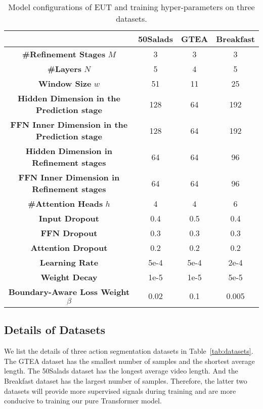 \documentclass[letterpaper]{article} \usepackage[submission]{aaai23}  \usepackage{times}  \usepackage{helvet}  \usepackage{courier}  \usepackage[hyphens]{url}  \usepackage{graphicx} \urlstyle{rm} \def\UrlFont{\rm}  \usepackage{natbib}  \usepackage{caption} \frenchspacing  \setlength{\pdfpagewidth}{8.5in} \setlength{\pdfpageheight}{11in} \usepackage{algorithm}
\begin{document}
\begin{table*}[t]
\centering
\begin{tabular}{cccc}
    \toprule
    & 50Salads & GTEA  & Breakfast \\
    \midrule
    \textbf{\#Refinement Stages} $M$                & 3 & 3 & 3 \\
    \textbf{\#Layers} $N$                & 5 &  4 & 5 \\
    \textbf{Window Size} $w$                & 51 & 11 & 25 \\
    \textbf{Hidden Dimension in the Prediction stage}   & 128 & 64 &  192\\
    \textbf{FFN Inner Dimension in the Prediction stage}     & 128 & 64 &  192\\
    \textbf{Hidden Dimension in Refinement stages}   & 64 &  64 & 96\\
    \textbf{FFN Inner Dimension in Refinement stages} & 64 &  64 & 96\\
    \textbf{\#Attention Heads} $h$           & 4 &  4 & 6\\
    \textbf{Input Dropout}  & 0.4 & 0.5  & 0.4\\
    \textbf{FFN Dropout}    & 0.3 & 0.3 &  0.3\\
    \textbf{Attention Dropout}    & 0.2 &  0.2 &  0.2\\
    \textbf{Learning Rate}   & 5e-4 & 5e-4 &  2e-4\\
    \textbf{Weight Decay}   & 1e-5 & 1e-5 &  5e-5\\
    \textbf{Boundary-Aware Loss Weight $\beta$}   & 0.02 & 0.1 &  0.005\\
    \bottomrule
\end{tabular}
\caption{Model configurations of EUT and training hyper-parameters on three datasets.}
\label{tab:hyperparameters}
\end{table*}

\subsection{Details of Datasets}
\label{sec:dataset}
We list the details of three action segmentation datasets in Table~\ref{tab:datasets}. The GTEA dataset has the smallest number of samples and the shortest average length. The 50Salads dataset has the longest average video length. And the Breakfast dataset has the largest number of samples. Therefore, the latter two datasets will provide more supervised signals during training and are more conducive to training our pure Transformer model.
\end{document}
